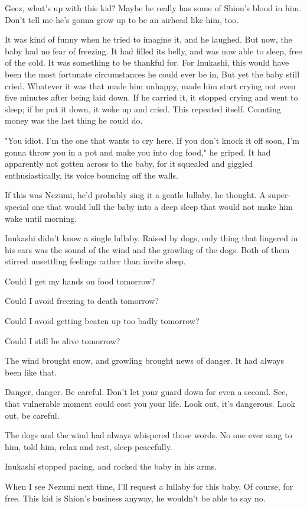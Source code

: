 Geez, what's up with this kid? Maybe he really has some of Shion's blood
in him. Don't tell me he's gonna grow up to be an airhead like him, too.

It was kind of funny when he tried to imagine it, and he laughed. But
now, the baby had no fear of freezing. It had filled its belly, and was
now able to sleep, free of the cold. It was something to be thankful
for. For Inukashi, this would have been the most fortunate circumstances
he could ever be in, But yet the baby still cried. Whatever it was that
made him unhappy, made him start crying not even five minutes after
being laid down. If he carried it, it stopped crying and went to sleep;
if he put it down, it woke up and cried. This repeated itself. Counting
money was the last thing he could do.

"You idiot. I'm the one that wants to cry here. If you don't knock it
off soon, I'm gonna throw you in a pot and make you into dog food," he
griped. It had apparently not gotten across to the baby, for it squealed
and giggled enthusiastically, its voice bouncing off the walls.

If this was Nezumi, he'd probably sing it a gentle lullaby, he thought.
A super-special one that would lull the baby into a deep sleep that
would not make him wake until morning.

Inukashi didn't know a single lullaby. Raised by dogs, only thing that
lingered in his ears was the sound of the wind and the growling of the
dogs. Both of them stirred unsettling feelings rather than invite sleep.

Could I get my hands on food tomorrow?

Could I avoid freezing to death tomorrow?

Could I avoid getting beaten up too badly tomorrow?

Could I still be alive tomorrow?

The wind brought snow, and growling brought news of danger. It had
always been like that.

Danger, danger. Be careful. Don't let your guard down for even a second.
See, that vulnerable moment could cost you your life. Look out, it's
dangerous. Look out, be careful.

The dogs and the wind had always whispered those words. No one ever sang
to him, told him, relax and rest, sleep peacefully.

Inukashi stopped pacing, and rocked the baby in his arms.

When I see Nezumi next time, I'll request a lullaby for this baby. Of
course, for free. This kid is Shion's business anyway, he wouldn't be
able to say no.

